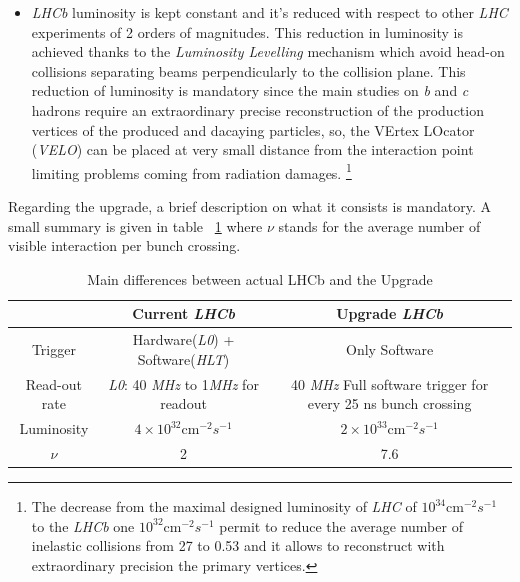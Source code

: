 \documentclass[paper=a4, fontsize=10pt]{scrartcl}
\numberwithin{equation}{section}		%
\numberwithin{figure}{section}			%
\numberwithin{table}{section}				%
\begin{document}
\begin{itemize}
\item{\textit{LHCb} luminosity is kept constant and it's reduced with respect to other \textit{LHC} experiments of 2 orders of magnitudes. This reduction in luminosity is achieved thanks to the \textit{Luminosity Levelling} mechanism which avoid head-on collisions separating beams perpendicularly to the collision plane. This reduction of luminosity is mandatory since the main studies on \textit{b} and \textit{c} hadrons require an extraordinary precise reconstruction of the production vertices of the produced and dacaying particles, so, the VErtex LOcator (\textit{VELO}) can be placed at very small distance from the interaction point limiting problems coming from radiation damages. \footnote{The decrease from the maximal designed luminosity of \textit{LHC} of $10^{34}$cm$^{-2}s^{-1}$ to the \textit{LHCb} one  $10^{32}$cm$^{-2}s^{-1}$ permit to reduce the average number of inelastic collisions from 27 to 0.53 and it allows to reconstruct with extraordinary precision the primary vertices.}}
\end{itemize}

Regarding the upgrade, a brief description on what it consists is mandatory. A small summary is given in table ~\ref{table:runningCondition} where $\nu$ stands for the average number of visible interaction per bunch crossing.

\begin{table}[h]
\centering
\begin{tabular}{|c|c|c|}
\hline
           & \textbf{Current \textit{LHCb}}          & \textbf{Upgrade \textit{LHCb}} \\ \hline
Trigger    & Hardware(\textit{L0}) + Software(\textit{HLT}) & Only Software \\ \hline
Read-out rate & \textit{L0}: 40 \textit{MHz} to 1\textit{MHz} for readout & 40 \textit{MHz} Full software trigger for every 25 ns bunch crossing \\ \hline
Luminosity & $4 \times 10 ^{32}$cm$^{-2}s^{-1}$ & $2\times 10^{33}$cm$^{-2}s^{-1}$ \\ \hline
$\nu $ & 2 & 7.6 \\ \hline

\end{tabular}
\caption{Main differences between actual LHCb and the Upgrade}\label{table:runningCondition}
\end{table}
\end{document}
